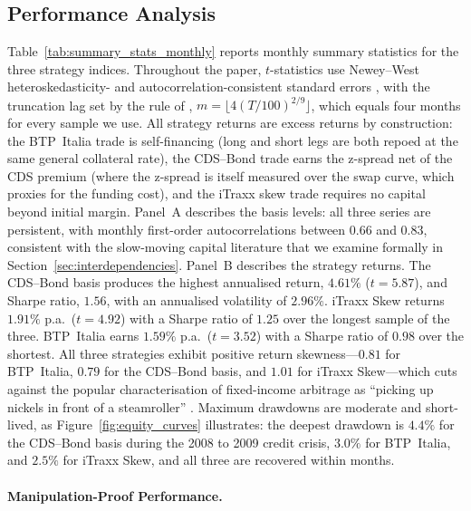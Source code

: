 
\subsection{Performance Analysis}
\label{sec:performance}

Table~\ref{tab:summary_stats_monthly} reports monthly summary
statistics for the three strategy indices. Throughout the paper,
$t$-statistics use Newey--West heteroskedasticity- and
autocorrelation-consistent standard errors \citep{newey1987simple},
with the truncation lag set by the rule of \citet{newey1994automatic},
$m = \lfloor 4(T/100)^{2/9} \rfloor$, which equals four months for
every sample we use. All strategy returns are
excess returns by construction: the BTP~Italia trade is self-financing
(long and short legs are both repoed at the same general collateral
rate), the CDS--Bond trade earns the z-spread net of the CDS premium
(where the z-spread is itself measured over the swap curve, which
proxies for the funding cost), and the iTraxx skew trade requires no
capital beyond initial margin. Panel~A describes the basis levels: all
three series are persistent, with monthly first-order autocorrelations
between $0.66$ and $0.83$, consistent with the slow-moving capital
literature \citep{duffie2010presidential, brunnermeier2009market,
mitchell2007slow} that we examine formally in
Section~\ref{sec:interdependencies}. Panel~B describes the strategy
returns. The CDS--Bond basis produces the highest annualised return,
$4.61\%$ ($t = 5.87$), and Sharpe ratio, $1.56$, with an annualised
volatility of $2.96\%$. iTraxx Skew returns $1.91\%$ p.a.\
($t = 4.92$) with a Sharpe ratio of $1.25$ over the longest sample of
the three. BTP~Italia earns $1.59\%$ p.a.\ ($t = 3.52$) with a Sharpe
ratio of $0.98$ over the shortest. All three strategies exhibit
positive return skewness---$0.81$ for BTP~Italia, $0.79$ for the
CDS--Bond basis, and $1.01$ for iTraxx Skew---which cuts against
the popular characterisation of fixed-income arbitrage as ``picking up
nickels in front of a steamroller'' \citep{duarte2007risk}. Maximum
drawdowns are moderate and short-lived, as
Figure~\ref{fig:equity_curves} illustrates: the deepest drawdown is
$4.4\%$ for the CDS--Bond basis during the 2008 to 2009 credit crisis,
$3.0\%$ for BTP~Italia, and $2.5\%$ for iTraxx Skew, and all three
are recovered within months.

\paragraph{Manipulation-Proof Performance.}

